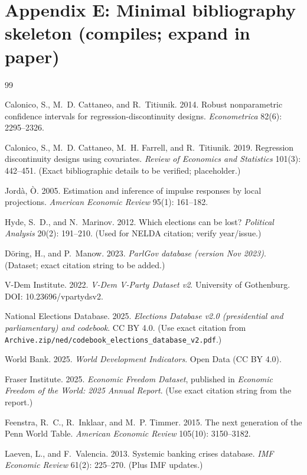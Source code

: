 \documentclass[11pt]{article}
\newcommand{\1}{\mathbf{1}}
\begin{document}
\section*{Appendix E: Minimal bibliography skeleton (compiles; expand in paper)}
\begin{thebibliography}{99}

Calonico, S., M.~D. Cattaneo, and R.~Titiunik. 2014.
\newblock Robust nonparametric confidence intervals for regression-discontinuity designs.
\newblock \emph{Econometrica} 82(6): 2295--2326.

Calonico, S., M.~D. Cattaneo, M.~H. Farrell, and R.~Titiunik. 2019.
\newblock Regression discontinuity designs using covariates.
\newblock \emph{Review of Economics and Statistics} 101(3): 442--451. (Exact bibliographic details to be verified; placeholder.)

Jord\`a, \`O. 2005.
\newblock Estimation and inference of impulse responses by local projections.
\newblock \emph{American Economic Review} 95(1): 161--182.

Hyde, S.~D., and N.~Marinov. 2012.
\newblock Which elections can be lost?
\newblock \emph{Political Analysis} 20(2): 191--210. (Used for NELDA citation; verify year/issue.)

D\"oring, H., and P.~Manow. 2023.
\newblock \emph{ParlGov database (version Nov 2023)}. (Dataset; exact citation string to be added.)

V-Dem Institute. 2022.
\newblock \emph{V-Dem V-Party Dataset v2}. University of Gothenburg. DOI: 10.23696/vpartydsv2.

National Elections Database. 2025.
\newblock \emph{Elections Database v2.0 (presidential and parliamentary) and codebook}. CC BY 4.0. (Use exact citation from \texttt{Archive.zip/ned/codebook\_elections\_database\_v2.pdf}.)

World Bank. 2025.
\newblock \emph{World Development Indicators}. Open Data (CC BY 4.0).

Fraser Institute. 2025.
\newblock \emph{Economic Freedom Dataset}, published in \emph{Economic Freedom of the World: 2025 Annual Report}. (Use exact citation string from the report.)

Feenstra, R.~C., R.~Inklaar, and M.~P. Timmer. 2015.
\newblock The next generation of the {P}enn {W}orld {T}able.
\newblock \emph{American Economic Review} 105(10): 3150--3182.

Laeven, L., and F.~Valencia. 2013.
\newblock Systemic banking crises database.
\newblock \emph{IMF Economic Review} 61(2): 225--270. (Plus IMF updates.)

\end{thebibliography}
\end{document}
